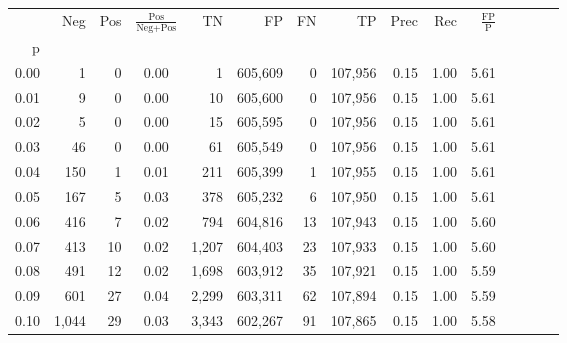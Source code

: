 \begin{tabular}{rrrcrrrrrrrrrrr}
\toprule
{} &     Neg &    Pos & $\frac{\text{Pos}}{\text{Neg}+\text{Pos}}$ &       TN &       FP &       FN &       TP &  Prec &   Rec & $\frac{\text{FP}}{\text{P}}$ \\
p    &         &        &                                            &          &          &          &          &       &       &                              \\
\midrule
0.00 &       1 &      0 &                                       0.00 &        1 &  605,609 &        0 &  107,956 &  0.15 &  1.00 &                         5.61 \\
0.01 &       9 &      0 &                                       0.00 &       10 &  605,600 &        0 &  107,956 &  0.15 &  1.00 &                         5.61 \\
0.02 &       5 &      0 &                                       0.00 &       15 &  605,595 &        0 &  107,956 &  0.15 &  1.00 &                         5.61 \\
0.03 &      46 &      0 &                                       0.00 &       61 &  605,549 &        0 &  107,956 &  0.15 &  1.00 &                         5.61 \\
0.04 &     150 &      1 &                                       0.01 &      211 &  605,399 &        1 &  107,955 &  0.15 &  1.00 &                         5.61 \\
0.05 &     167 &      5 &                                       0.03 &      378 &  605,232 &        6 &  107,950 &  0.15 &  1.00 &                         5.61 \\
0.06 &     416 &      7 &                                       0.02 &      794 &  604,816 &       13 &  107,943 &  0.15 &  1.00 &                         5.60 \\
0.07 &     413 &     10 &                                       0.02 &    1,207 &  604,403 &       23 &  107,933 &  0.15 &  1.00 &                         5.60 \\
0.08 &     491 &     12 &                                       0.02 &    1,698 &  603,912 &       35 &  107,921 &  0.15 &  1.00 &                         5.59 \\
0.09 &     601 &     27 &                                       0.04 &    2,299 &  603,311 &       62 &  107,894 &  0.15 &  1.00 &                         5.59 \\
0.10 &   1,044 &     29 &                                       0.03 &    3,343 &  602,267 &       91 &  107,865 &  0.15 &  1.00 &                         5.58 \\

\end{tabular}
